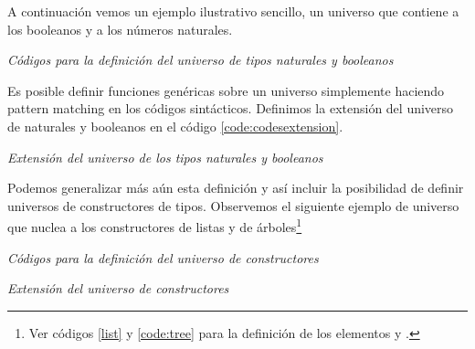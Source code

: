 A continuación vemos un ejemplo ilustrativo sencillo, un universo que contiene a los booleanos y a los números naturales.

\begin{agdacode}\label{code:codes}{\it Códigos para la definición del universo de tipos naturales y booleanos }

\end{agdacode}

Es posible definir funciones genéricas sobre un universo simplemente haciendo pattern matching en los códigos sintácticos. Definimos la extensión del universo de naturales y booleanos en el código \ref{code:codesextension}.

\begin{agdacode}\label{code:codesextension}{\it Extensión del universo de los tipos naturales y booleanos }

\end{agdacode}

Podemos generalizar más aún esta definición y así incluir la posibilidad de definir universos de constructores de tipos. Observemos el siguiente ejemplo de universo que nuclea a los constructores de listas y de árboles\footnote{Ver códigos \ref{list} y \ref{code:tree} para la definición de los elementos  y .}

\begin{agdacode}\label{code:codes2}{\it Códigos para la definición del universo de constructores }

\end{agdacode}

\begin{agdacode}\label{code:codesextension2}{\it Extensión del universo de constructores }

\end{agdacode}





